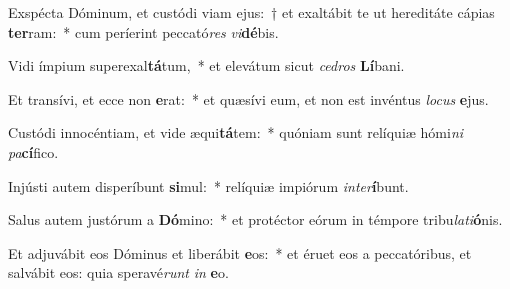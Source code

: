 \item Exspécta Dóminum, et custódi viam ejus:~† et exaltábit te ut hereditáte cápias \textbf{ter}ram:~* cum períerint peccató\textit{res} \textit{vi}\textbf{dé}bis.
\item Vidi ímpium superexal\textbf{tá}tum,~* et elevátum sicut \textit{ce}\textit{dros} \textbf{Lí}bani.
\item Et transívi, et ecce non \textbf{e}rat:~* et quæsívi eum, et non est invéntus \textit{lo}\textit{cus} \textbf{e}jus.
\item Custódi innocéntiam, et vide æqui\textbf{tá}tem:~* quóniam sunt relíquiæ hómi\textit{ni} \textit{pa}\textbf{cí}fico.
\item Injústi autem disperíbunt \textbf{si}mul:~* relíquiæ impiórum \textit{in}\textit{ter}\textbf{í}bunt.
\item Salus autem justórum a \textbf{Dó}mino:~* et protéctor eórum in témpore tribu\textit{la}\textit{ti}\textbf{ó}nis.
\item Et adjuvábit eos Dóminus et liberábit \textbf{e}os:~* et éruet eos a peccatóribus, et salvábit eos: quia speravé\textit{runt} \textit{in} \textbf{e}o.
